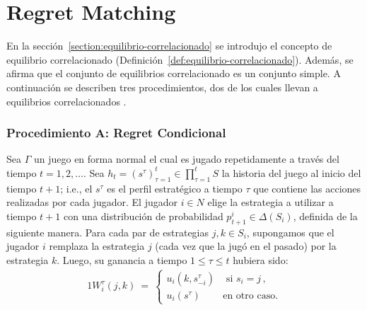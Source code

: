 \chapter{Regret Matching}
\label{chapter:regret-matching}

\newcommand{\graphicsRM}[2]{
\begin{figure}[h]
    \resizebox{\textwidth}{!}{
    \texttt{[image: graficas/regret-matching/\#1/procedimiento-A.png]}
    \texttt{[image: graficas/regret-matching/\#1/procedimiento-B.png]} 
    \texttt{[image: graficas/regret-matching/\#1/procedimiento-C.png]}
    }
    \caption{Gráficas del \textit{regret} con respecto al número de iteraciones del juego #2.}
    \label{fig:regret-rm-#1}
\end{figure}
}

En la sección~\ref{section:equilibrio-correlacionado} se introdujo el concepto de equilibrio correlacionado (Definición~\ref{def:equilibrio-correlacionado}). Además, se afirma que el conjunto de equilibrios correlacionado es un conjunto simple. A continuación se describen tres procedimientos, dos de los cuales llevan a equilibrios correlacionados \cite{bib:correlated-equilibrium}.

\subsection*{Procedimiento A: Regret Condicional \cite{bib:correlated-equilibrium}}

Sea $\Gamma$ un juego en forma normal el cual es jugado repetidamente a través del tiempo $t = 1, 2, \ldots $. 
Sea $h_t = (s^\tau)_{\tau = 1}^t \in \prod_{\tau = 1}^{t} S$ la historia del juego al inicio del tiempo $t+1$; i.e., el $s^\tau$ es el perfil estratégico a tiempo $\tau$ que contiene las acciones realizadas por cada jugador. El jugador $i \in N$ elige la estrategia a utilizar a tiempo $t+1$ con una distribución de probabilidad $p_{t+1}^i \in \Delta(S_i)$, definida de la siguiente manera. Para cada par de estrategias $j, k \in S_i$, supongamos que el jugador $i$ remplaza la estrategia $j$ (cada vez que la jugó en el pasado) por la estrategia $k$. Luego, su ganancia a tiempo $1\leq \tau \leq t$ hubiera sido:
\begin{alignat}{1}
W_i^{\tau}(j,k)\ =\ 
\begin{cases}
u_i(k, s_{-i}^{\tau}) &\text{ si } s_i = j \,, \\
u_i(s^\tau) & \text{en otro caso.} 
\end{cases}
\end{alignat}

